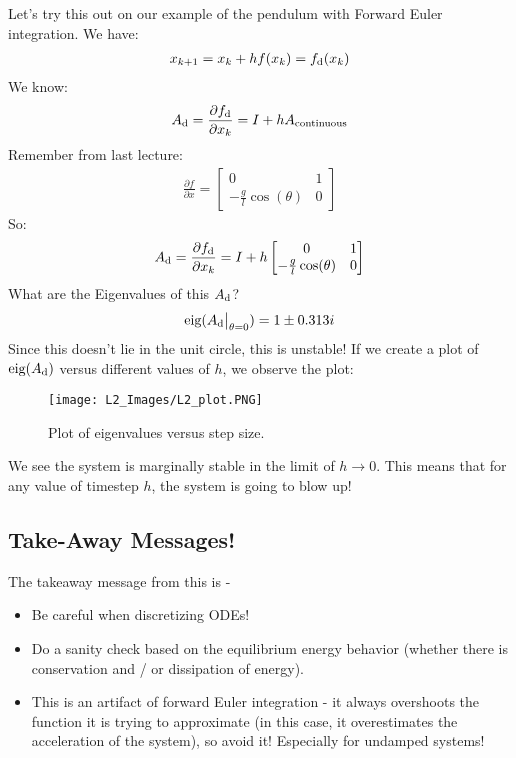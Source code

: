 \noindent
Let's try this out on our example of the pendulum with Forward Euler integration. 
We have: 
\begin{align}
    x_{k+1} = x_{k} + h f(x_k) = f_{\rm d} (x_k)
\end{align}
We know: 
\begin{align}
    A_{\rm d} = \frac{\partial f_{\rm d}}{\partial x_k} = I + h A_{\rm continuous}
\end{align}
Remember from last lecture: 
\begin{align}
    \frac{\partial f}{\partial x} = \begin{bmatrix}
        0 & 1 \\
        - \frac{g}{l} \cos(\theta) & 0
    \end{bmatrix}
\end{align}
So: 
\begin{align}
    A_{\rm d} = \frac{\partial f_{\rm d}}{\partial x_k} = I + h \begin{bmatrix}
        0 & 1 \\
        - \frac{g}{l} \cos(\theta) & 0
    \end{bmatrix}
\end{align}
What are the Eigenvalues of this $A_{\rm d}$? 
\begin{align}
    \textrm{eig} ( \evalat{A_{\rm d}}{\theta=0} ) = 1 \pm 0.313 i
\end{align}
Since this doesn't lie in the unit circle, this is unstable! 
If we create a plot of $\textrm{eig}(A_{\rm d})$ versus different values of $h$, we observe the plot: 
\begin{figure}
    \centering
    \texttt{[image: L2\_Images/L2\_plot.PNG]}
    \caption{Plot of eigenvalues versus step size.}
    \label{fig:l2f1}
\end{figure}
We see the system is marginally stable in the limit of $h \rightarrow 0$. This means that for any value of timestep $h$, the system is going to blow up!

\subsection{Take-Away Messages!}
The takeaway message from this is - 
\begin{itemize}
    \item Be careful when discretizing ODEs!
    \item Do a sanity check based on the equilibrium energy behavior (whether there is conservation and / or dissipation of energy). 
    \item This is an artifact of forward Euler integration - it always overshoots the function it is trying to approximate (in this case, it overestimates the acceleration of the system), so avoid it!
    Especially for undamped systems! 
\end{itemize}

